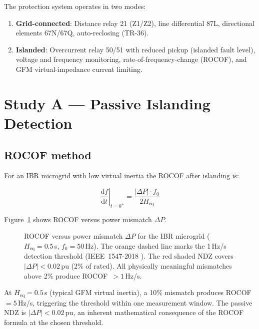 \documentclass[11pt,a4paper]{article}
\begin{document}
The protection system operates in two modes:
\begin{enumerate}
  \item \textbf{Grid-connected}: Distance relay 21 (Z1/Z2), line differential
    87L, directional elements 67N/67Q, auto-reclosing (TR-36).
  \item \textbf{Islanded}: Overcurrent relay 50/51 with reduced pickup (islanded
    fault level), voltage and frequency monitoring, rate-of-frequency-change
    (ROCOF), and GFM virtual-impedance current limiting.
\end{enumerate}

\section{Study A --- Passive Islanding Detection}
\label{sec:studyA}

\subsection{ROCOF method}

For an IBR microgrid with low virtual inertia the ROCOF after islanding is:

\begin{equation}
  \left.\frac{\mathrm{d}f}{\mathrm{d}t}\right|_{t=0^+}
  = \frac{|\Delta P| \cdot f_0}{2 H_\mathrm{eq}}
\end{equation}

Figure~\ref{fig:rocof} shows ROCOF versus power mismatch $\Delta P$.

\begin{figure}[htbp]
  \centering
  \resizebox{0.88\textwidth}{!}{}
  \caption{ROCOF versus power mismatch $\Delta P$ for the IBR microgrid
           ($H_\mathrm{eq}=0.5$\,s, $f_0=50$\,Hz).  The orange dashed line
           marks the 1\,Hz/s detection threshold (IEEE~1547-2018
           \cite{IEEE_1547_2018}).  The red shaded NDZ covers
           $|\Delta P|<0.02$\,pu (2\% of rated).  All physically meaningful
           mismatches above 2\% produce ROCOF~$>1$\,Hz/s.}
  \label{fig:rocof}
\end{figure}

\noindent
At $H_\mathrm{eq}=0.5$\,s (typical GFM virtual inertia), a 10\% mismatch
produces ROCOF\,$=5$\,Hz/s, triggering the threshold within one measurement
window.  The passive NDZ is $|\Delta P|<0.02$\,pu, an inherent mathematical
consequence of the ROCOF formula at the chosen threshold.
\end{document}
